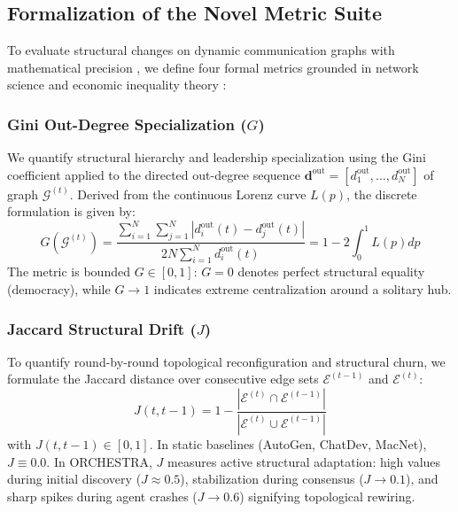 \documentclass{ieeeaccess}
\begin{document}
\subsection{Formalization of the Novel Metric Suite}
To evaluate structural changes on dynamic communication graphs with mathematical precision \cite{shannon1948mathematical}, we define four formal metrics grounded in network science and economic inequality theory \cite{gini1912variabilita, jaccard1912distribution, freeman1977set}:

\subsubsection{Gini Out-Degree Specialization ($G$)}
We quantify structural hierarchy and leadership specialization using the Gini coefficient applied to the directed out-degree sequence $\mathbf{d}^{\text{out}} = [d_1^{\text{out}}, \dots, d_N^{\text{out}}]$ of graph $\mathcal{G}^{(t)}$. Derived from the continuous Lorenz curve $L(p)$, the discrete formulation is given by:
\begin{equation}
\label{eq:gini_formulation}
G(\mathcal{G}^{(t)}) = \frac{\sum_{i=1}^N \sum_{j=1}^N \left| d_i^{\text{out}}(t) - d_j^{\text{out}}(t) \right|}{2 N \sum_{i=1}^N d_i^{\text{out}}(t)} = 1 - 2 \int_0^1 L(p) dp
\end{equation}
The metric is bounded $G \in [0, 1]$: $G = 0$ denotes perfect structural equality (democracy), while $G \to 1$ indicates extreme centralization around a solitary hub.

\subsubsection{Jaccard Structural Drift ($J$)}
To quantify round-by-round topological reconfiguration and structural churn, we formulate the Jaccard distance over consecutive edge sets $\mathcal{E}^{(t-1)}$ and $\mathcal{E}^{(t)}$:
\begin{equation}
\label{eq:jaccard_formulation}
J(t, t-1) = 1 - \frac{\left| \mathcal{E}^{(t)} \cap \mathcal{E}^{(t-1)} \right|}{\left| \mathcal{E}^{(t)} \cup \mathcal{E}^{(t-1)} \right|}
\end{equation}
with $J(t, t-1) \in [0, 1]$. In static baselines (AutoGen, ChatDev, MacNet), $J \equiv 0.0$. In ORCHESTRA, $J$ measures active structural adaptation: high values during initial discovery ($J \approx 0.5$), stabilization during consensus ($J \to 0.1$), and sharp spikes during agent crashes ($J \to 0.6$) signifying topological rewiring.
\end{document}
